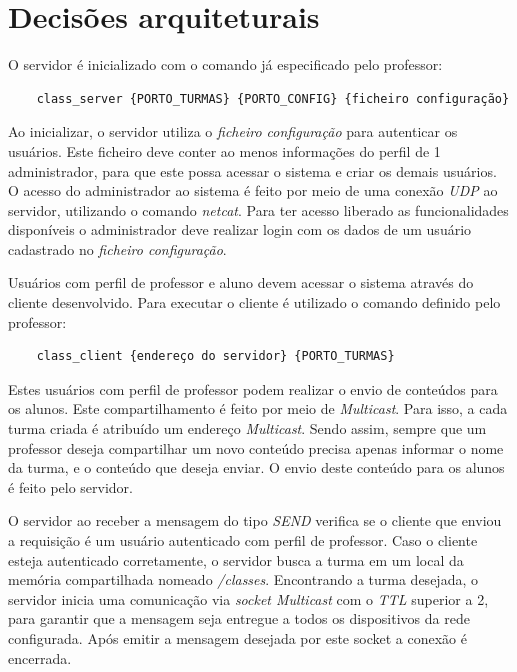 \documentclass[a4paper]{article}
\begin{document}
\section{Decisões arquiteturais}

O servidor é inicializado com o comando já especificado pelo professor:

\begin{verbatim}
    class_server {PORTO_TURMAS} {PORTO_CONFIG} {ficheiro configuração}
\end{verbatim}

Ao inicializar, o servidor utiliza o \textit{ficheiro configuração} para autenticar os usuários. Este ficheiro deve conter ao menos informações do perfil de 1 administrador, para que este possa acessar o sistema e criar os demais usuários. O acesso do administrador ao sistema é feito por meio de uma conexão  \textit{UDP} ao servidor, utilizando o comando \textit{netcat}. Para ter acesso liberado as funcionalidades disponíveis o administrador deve realizar login com os dados de um usuário cadastrado no \textit{ficheiro configuração}.

Usuários com perfil de professor e aluno devem acessar o sistema através do cliente desenvolvido. Para executar o cliente é utilizado o comando definido pelo professor:

\begin{verbatim}
    class_client {endereço do servidor} {PORTO_TURMAS}
\end{verbatim}

Estes usuários com perfil de professor podem realizar o envio de conteúdos para os alunos. Este compartilhamento é feito por meio de \textit{Multicast}. Para isso, a cada turma criada é atribuído um endereço \textit{Multicast}. Sendo assim, sempre que um professor deseja compartilhar um novo conteúdo precisa apenas informar o nome da turma, e o conteúdo que deseja enviar. O envio deste conteúdo para os alunos é feito pelo servidor.

O servidor ao receber a mensagem do tipo \textit{SEND} verifica se o cliente que enviou a requisição é um usuário autenticado com perfil de professor. Caso o cliente esteja autenticado corretamente, o servidor busca a turma em um local da memória compartilhada nomeado \textit{/classes}. Encontrando a turma desejada, o servidor inicia uma comunicação via \textit{socket Multicast} com o \textit{TTL} superior a 2, para garantir que a mensagem seja entregue a todos os dispositivos da rede configurada. Após emitir a mensagem desejada por este socket a conexão é encerrada.
\end{document}
